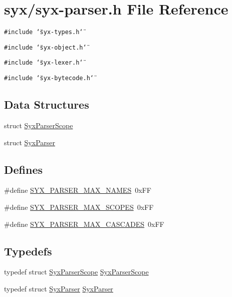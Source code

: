 \hypertarget{syx-parser_8h}{
\section{syx/syx-parser.h File Reference}
\label{syx-parser_8h}
}
{\tt \#include \char`\"{}syx-types.h\char`\"{}}\par
{\tt \#include \char`\"{}syx-object.h\char`\"{}}\par
{\tt \#include \char`\"{}syx-lexer.h\char`\"{}}\par
{\tt \#include \char`\"{}syx-bytecode.h\char`\"{}}\par
\subsection*{Data Structures}
\begin{CompactItemize}
\item 
struct \hyperlink{struct_syx_parser_scope}{SyxParserScope}
\item 
struct \hyperlink{struct_syx_parser}{SyxParser}
\end{CompactItemize}
\subsection*{Defines}
\begin{CompactItemize}
\item 
\#define \hyperlink{syx-parser_8h_1ac781464502bb6fc3de3b46d1c91f95}{SYX\_\-PARSER\_\-MAX\_\-NAMES}~0xFF
\item 
\#define \hyperlink{syx-parser_8h_1b7fb01cb07bf759bb8ce6fa8d403e61}{SYX\_\-PARSER\_\-MAX\_\-SCOPES}~0xFF
\item 
\#define \hyperlink{syx-parser_8h_b78eeb5d808753903d97c2cf5d316b8a}{SYX\_\-PARSER\_\-MAX\_\-CASCADES}~0xFF
\end{CompactItemize}
\subsection*{Typedefs}
\begin{CompactItemize}
\item 
typedef struct \hyperlink{struct_syx_parser_scope}{SyxParserScope} \hyperlink{syx-parser_8h_ffdbcc3716a97450450d0d0205832811}{SyxParserScope}
\item 
typedef struct \hyperlink{struct_syx_parser}{SyxParser} \hyperlink{syx-parser_8h_08047a799f946ac82a9e63c3ae9ffb11}{SyxParser}
\end{CompactItemize}
